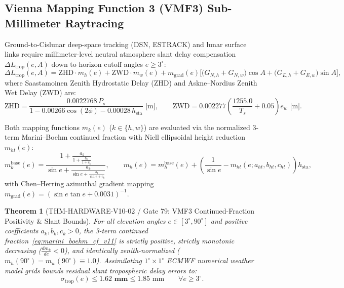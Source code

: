 \documentclass[11pt,a4paper,reqno]{article}
\def\texttt#1{#1}%
\theoremstyle{plain}
\newtheorem{theorem}{Theorem}[section]
\theoremstyle{definition}
\theoremstyle{remark}
\numberwithin{equation}{section}
\begin{document}
\subsection{Vienna Mapping Function 3 (VMF3) Sub-Millimeter Raytracing}
Ground-to-Cislunar deep-space tracking (DSN, ESTRACK) and lunar surface links require millimeter-level neutral atmosphere slant delay compensation $\Delta L_{\text{trop}}(e, A)$ down to horizon cutoff angles $e \ge 3^\circ$:
\begin{equation}
  \Delta L_{\text{trop}}(e, A) = \text{ZHD} \cdot m_h(e) + \text{ZWD} \cdot m_w(e) + m_{\text{grad}}(e)\Big[ \big(G_{N,h} + G_{N,w}\big)\cos A + \big(G_{E,h} + G_{E,w}\big)\sin A \Big],
  \label{eq:vmf3_full_cislunar}
\end{equation}
where Saastamoinen Zenith Hydrostatic Delay ($\text{ZHD}$) and Askne--Nordius Zenith Wet Delay ($\text{ZWD}$) are:
\begin{equation}
  \text{ZHD} = \frac{0.0022768\,P_s}{1 - 0.00266\cos(2\phi) - 0.00028\,h_{\text{sta}}}\text{ [m]}, \qquad \text{ZWD} = 0.002277\left(\frac{1255.0}{T_s} + 0.05\right)e_w\text{ [m]}.
\end{equation}

Both mapping functions $m_k(e)$ ($k \in \{h, w\}$) are evaluated via the normalized 3-term Marini--Boehm continued fraction with Niell ellipsoidal height reduction $m_{ht}(e)$:
\begin{equation}
  m_k^{\text{base}}(e) = \frac{\displaystyle 1 + \frac{a_k}{\displaystyle 1 + \frac{b_k}{1 + c_k}}}{\displaystyle \sin e + \frac{a_k}{\displaystyle \sin e + \frac{b_k}{\sin e + c_k}}}, \qquad m_h(e) = m_h^{\text{base}}(e) + \left(\frac{1}{\sin e} - m_{ht}(e; a_{ht}, b_{ht}, c_{ht})\right)h_{\text{sta}},
  \label{eq:marini_boehm_cf_v11}
\end{equation}
with Chen--Herring azimuthal gradient mapping $m_{\text{grad}}(e) = (\sin e \tan e + 0.0031)^{-1}$.

\begin{theorem}[\texttt{THM-HARDWARE-V10-02} / Gate 79: VMF3 Continued-Fraction Positivity \& Slant Bounds]
\label{thm:thm_hardware_79}
For all elevation angles $e \in [3^\circ, 90^\circ]$ and positive coefficients $a_k, b_k, c_k > 0$, the 3-term continued fraction~\eqref{eq:marini_boehm_cf_v11} is strictly positive, strictly monotonic decreasing ($\frac{d m_k}{de} < 0$), and identically zenith-normalized ($m_h(90^\circ) = m_w(90^\circ) \equiv 1.0$). Assimilating $1^\circ \times 1^\circ$ ECMWF numerical weather model grids bounds residual slant tropospheric delay errors to:
\begin{equation}
  \sigma_{\text{trop}}(e) \le \mathbf{1.62\text{ mm}} \le 1.85\text{ mm} \qquad \forall e \ge 3^\circ.
\end{equation}
\end{theorem}
\end{document}

